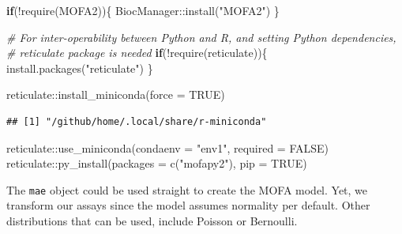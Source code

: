 \documentclass[
]{book}
\newenvironment{Shaded}{\begin{snugshade}}{\end{snugshade}}
\newcommand{\AttributeTok}[1]{\textcolor[rgb]{0.77,0.63,0.00}{#1}}
\newcommand{\CommentTok}[1]{\textcolor[rgb]{0.56,0.35,0.01}{\textit{#1}}}
\newcommand{\ConstantTok}[1]{\textcolor[rgb]{0.00,0.00,0.00}{#1}}
\newcommand{\ControlFlowTok}[1]{\textcolor[rgb]{0.13,0.29,0.53}{\textbf{#1}}}
\newcommand{\FunctionTok}[1]{\textcolor[rgb]{0.00,0.00,0.00}{#1}}
\newcommand{\NormalTok}[1]{#1}
\newcommand{\SpecialCharTok}[1]{\textcolor[rgb]{0.00,0.00,0.00}{#1}}
\newcommand{\StringTok}[1]{\textcolor[rgb]{0.31,0.60,0.02}{#1}}
\begin{document}
\begin{Shaded}
\begin{Highlighting}[]
\ControlFlowTok{if}\NormalTok{(}\SpecialCharTok{!}\FunctionTok{require}\NormalTok{(MOFA2))\{}
\NormalTok{    BiocManager}\SpecialCharTok{::}\FunctionTok{install}\NormalTok{(}\StringTok{"MOFA2"}\NormalTok{)}
\NormalTok{\}}

\CommentTok{\# For inter{-}operability between Python and R, and setting Python dependencies,}
\CommentTok{\# reticulate package is needed}
\ControlFlowTok{if}\NormalTok{(}\SpecialCharTok{!}\FunctionTok{require}\NormalTok{(reticulate))\{}
    \FunctionTok{install.packages}\NormalTok{(}\StringTok{"reticulate"}\NormalTok{)}
\NormalTok{\}}

\NormalTok{reticulate}\SpecialCharTok{::}\FunctionTok{install\_miniconda}\NormalTok{(}\AttributeTok{force =} \ConstantTok{TRUE}\NormalTok{)}
\end{Highlighting}
\end{Shaded}

\begin{verbatim}
## [1] "/github/home/.local/share/r-miniconda"
\end{verbatim}

\begin{Shaded}
\begin{Highlighting}[]
\NormalTok{reticulate}\SpecialCharTok{::}\FunctionTok{use\_miniconda}\NormalTok{(}\AttributeTok{condaenv =} \StringTok{"env1"}\NormalTok{, }\AttributeTok{required =} \ConstantTok{FALSE}\NormalTok{)}
\NormalTok{reticulate}\SpecialCharTok{::}\FunctionTok{py\_install}\NormalTok{(}\AttributeTok{packages =} \FunctionTok{c}\NormalTok{(}\StringTok{"mofapy2"}\NormalTok{), }\AttributeTok{pip =} \ConstantTok{TRUE}\NormalTok{)}
\end{Highlighting}
\end{Shaded}

The \texttt{mae} object could be used straight to create the MOFA model. Yet, we transform
our assays since the model assumes normality per default. Other distributions that
can be used, include Poisson or Bernoulli.
\end{document}
